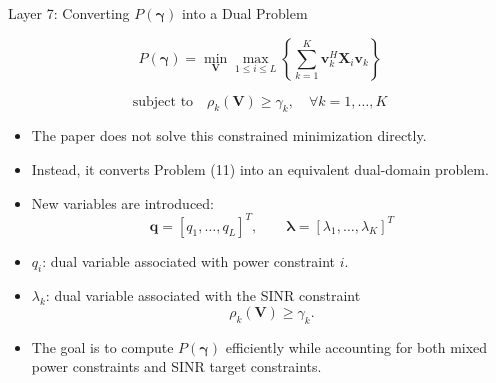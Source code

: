 \documentclass{beamer}
\begin{document}
\begin{frame}{Layer 7: Converting \(P(\boldsymbol{\gamma})\) into a Dual Problem}
\scriptsize

\[
P(\boldsymbol{\gamma})
=
\min_{\mathbf{V}}
\max_{1\le i\le L}
\left\{
\sum_{k=1}^{K}
\mathbf{v}_k^H\mathbf{X}_i\mathbf{v}_k
\right\}
\]

\[
\text{subject to}
\quad
\rho_k(\mathbf{V})\ge\gamma_k,
\quad \forall k=1,\ldots,K
\]

\begin{itemize}
    \item The paper does not solve this constrained minimization directly.

    \item Instead, it converts Problem (11) into an equivalent dual-domain problem.

    \item New variables are introduced:
    \[
        \mathbf{q}=[q_1,\ldots,q_L]^T,
        \qquad
        \boldsymbol{\lambda}=[\lambda_1,\ldots,\lambda_K]^T
    \]

    \item \(q_i\): dual variable associated with power constraint \(i\).

    \item \(\lambda_k\): dual variable associated with the SINR constraint
    \[
        \rho_k(\mathbf{V})\ge\gamma_k.
    \]

    \item The goal is to compute \(P(\boldsymbol{\gamma})\) efficiently while accounting for both mixed power constraints and SINR target constraints.
\end{itemize}

\end{frame}
\end{document}
